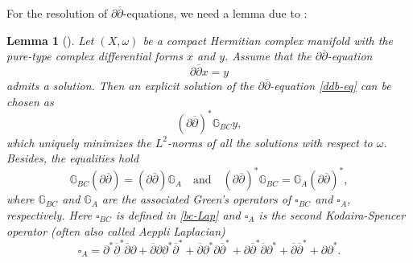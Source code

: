 \documentclass[12pt]{amsart}
\numberwithin{equation}{section}
\newtheorem{lemma}  [theorem]     {Lemma}
\renewcommand{\1}{\mathds{1}}
\newcommand{\G}{\mathbb{G}}
\newcommand{\db}{\overline{\partial}}
\renewcommand{\>}{\rightarrow}
\newcommand{\p}{\partial}
\def\p{\partial}
\begin{document}
For the resolution of $\p\db$-equations, we need a lemma due to \cite[Theorem $4.1$]{P1}:
\begin{lemma}[]\label{ddbar-eq}
Let $(X,\omega)$ be a compact Hermitian complex manifold with the
pure-type complex differential forms $x$ and $y$. Assume that the
$\p \db$-equation
\begin{equation}\label{ddb-eq}
\p \db x =y
\end{equation}
admits a solution. Then an explicit solution of the $\p
\db$-equation \eqref{ddb-eq} can be chosen as
$$(\p\db)^*\G_{BC}y,$$
which uniquely minimizes the $L^2$-norms of all the solutions with
respect to $\omega$. Besides, the equalities hold
\[\G_{BC}(\p\db) = (\p\db) \G_{A}\quad \text{and} \quad (\p\db)^*\G_{BC} = \G_{A}(\p\db)^*,\]
where $\G_{BC}$ and $\G_{A}$ are the associated Green's operators of
$\square_{BC}$ and $\square_{A}$, respectively. Here $\square_{BC}$
is defined in \eqref{bc-Lap} and $\square_{{A}}$ is the \emph{second
Kodaira-Spencer operator} (often also called \emph{Aeppli
Laplacian})
$$\square_{{A}}=\p^*\db^*\db\p+\db\p\p^*\db^*+\db\p^*\p\db^*+\p\db^*\db\p^*+\db\db^*+\p\p^*.$$
\end{lemma}
\end{document}
